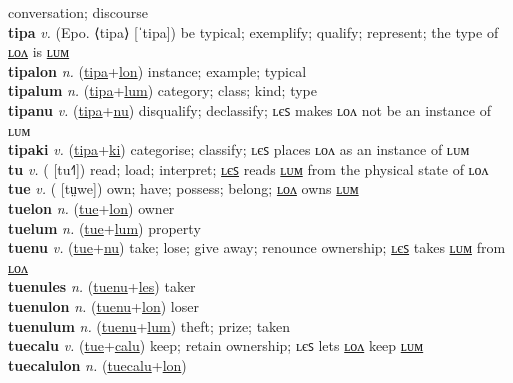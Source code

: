conversation; discourse \label{titilwel} \\
\textbf{tipa} \textit{v.} (Epo. ⟨tipa⟩ [ˈtipa])
be typical; exemplify; qualify; represent; the type of \hyperref[tipalon]{ʟᴏᴧ} is \hyperref[tipalum]{ʟᴜᴍ} \label{tipa} \\
\textbf{tipalon} \textit{n.} (\hyperref[tipa]{tipa}+\hyperref[lon]{lon})
instance; example; typical \label{tipalon} \\
\textbf{tipalum} \textit{n.} (\hyperref[tipa]{tipa}+\hyperref[lum]{lum})
category; class; kind; type \label{tipalum} \\
\textbf{tipanu} \textit{v.} (\hyperref[tipa]{tipa}+\hyperref[nu]{nu})
disqualify; declassify; ʟєꜱ makes ʟᴏᴧ not be an instance of ʟᴜᴍ \label{tipanu} \\
\textbf{tipaki} \textit{v.} (\hyperref[tipa]{tipa}+\hyperref[ki]{ki})
categorise; classify; ʟєꜱ places ʟᴏᴧ as an instance of ʟᴜᴍ \label{tipaki} \\
\textbf{tu} \textit{v.} ( [tu˧˥])
read; load; interpret; \hyperref[tules]{ʟєꜱ} reads \hyperref[tulum]{ʟᴜᴍ} from the physical state of ʟᴏᴧ \label{tu} \\
\textbf{tue} \textit{v.} ( [tṳwe])
own; have; possess; belong; \hyperref[tuelon]{ʟᴏᴧ} owns \hyperref[tuelum]{ʟᴜᴍ} \label{tue} \\
\textbf{tuelon} \textit{n.} (\hyperref[tue]{tue}+\hyperref[lon]{lon})
owner \label{tuelon} \\
\textbf{tuelum} \textit{n.} (\hyperref[tue]{tue}+\hyperref[lum]{lum})
property \label{tuelum} \\
\textbf{tuenu} \textit{v.} (\hyperref[tue]{tue}+\hyperref[nu]{nu})
take; lose; give away; renounce ownership; \hyperref[tuenules]{ʟєꜱ} takes \hyperref[tuenulum]{ʟᴜᴍ} from \hyperref[tuenulon]{ʟᴏᴧ} \label{tuenu} \\
\textbf{tuenules} \textit{n.} (\hyperref[tuenu]{tuenu}+\hyperref[les]{les})
taker \label{tuenules} \\
\textbf{tuenulon} \textit{n.} (\hyperref[tuenu]{tuenu}+\hyperref[lon]{lon})
loser \label{tuenulon} \\
\textbf{tuenulum} \textit{n.} (\hyperref[tuenu]{tuenu}+\hyperref[lum]{lum})
theft; prize; taken \label{tuenulum} \\
\textbf{tuecalu} \textit{v.} (\hyperref[tue]{tue}+\hyperref[calu]{calu})
keep; retain ownership; ʟєꜱ lets \hyperref[tuecalulon]{ʟᴏᴧ} keep \hyperref[tuecalulum]{ʟᴜᴍ} \label{tuecalu} \\
\textbf{tuecalulon} \textit{n.} (\hyperref[tuecalu]{tuecalu}+\hyperref[lon]{lon})
